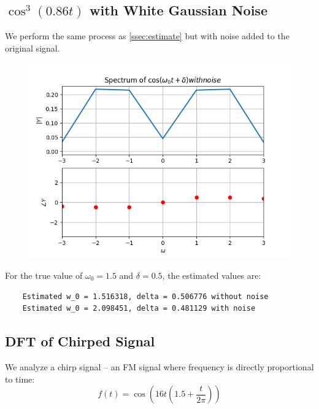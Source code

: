\documentclass[12pt, a4paper]{article}
\begin{document}
\subsection{$\cos^3(0.86t)$ with White Gaussian Noise}
We perform the same process as \ref{ssec:estimate} but with noise added to the original signal.
\begin{figure}[H]
    \centering
    \includegraphics[scale=0.7]{q4.png}
\end{figure}

For the true value of $\omega_0 = 1.5$ and $\delta = 0.5$, the estimated values are:
\begin{lstlisting}
    Estimated w_0 = 1.516318, delta = 0.506776 without noise
    Estimated w_0 = 2.098451, delta = 0.481129 with noise
\end{lstlisting}


\subsection{DFT of Chirped Signal}
We analyze a chirp signal -- an FM signal where frequency is directly proportional to time:
\begin{equation*}
    f(t) = \cos(16t\left(1.5 + \frac{t}{2\pi}\right))
\end{equation*}
\end{document}
